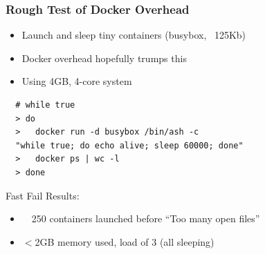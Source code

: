 \documentclass[xcolor=dvipsnames]{beamer}
\newcommand{\cpause}{}
\begin{document}
\begin{frame}[fragile]
  \frametitle{Rough Test of Docker Overhead}

  \begin{itemize}
    \item Launch and sleep tiny containers (busybox, ~125Kb)
    \item Docker overhead hopefully trumps this
    \item Using 4GB, 4-core system
  \end{itemize}
  \cpause

  \begin{lstlisting}
  # while true
  > do 
  >   docker run -d busybox /bin/ash -c 
  "while true; do echo alive; sleep 60000; done"
  >   docker ps | wc -l 
  > done
  \end{lstlisting}
  \cpause

  Fast Fail Results:  
   
  \begin{itemize}
    \item ~~250 containers launched before ``Too many open files''
    \item $<$2GB memory used, load of 3 (all sleeping)
  \end{itemize}

\end{frame}
\end{document}
